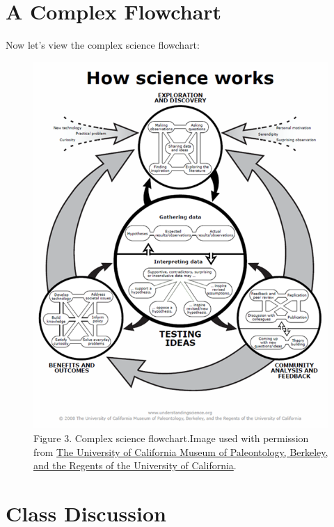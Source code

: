 \documentclass[
]{book}
\begin{document}
\hypertarget{a-complex-flowchart}{%
\section*{A Complex Flowchart}\label{a-complex-flowchart}}

Now let's view the complex science flowchart:

\begin{figure}
\centering
\includegraphics{figures_images/Lab2a-Fig3.png}
\caption{Figure 3. Complex science flowchart.Image used with permission from \href{https://qubeshub.org/community/groups/coursesource/publications?id=2625\&v=1}{The University of California Museum of Paleontology, Berkeley, and the Regents of the University of California}.}
\end{figure}

\hypertarget{class-discussion}{%
\section*{Class Discussion}\label{class-discussion}}
\end{document}
